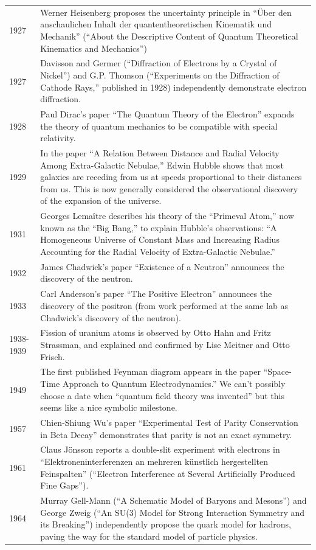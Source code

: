 \documentclass[../../main.tex]{subfiles}
\begin{document}
\begin{center}
\begin{longtable}{p{}  p{}}
1927&Werner Heisenberg proposes the uncertainty principle in “Über den anschaulichen Inhalt der quantentheoretischen Kinematik und Mechanik” (“About the Descriptive Content of Quantum Theoretical Kinematics and Mechanics”)\\
1927&Davisson and Germer (“Diffraction of Electrons by a Crystal of Nickel”) and G.P. Thomson (“Experiments on the Diffraction of Cathode Rays,” published in 1928) independently demonstrate electron diffraction.\\
1928&Paul Dirac's paper “The Quantum Theory of the Electron” expands the theory of quantum mechanics to be compatible with special relativity.\\
1929&In the paper “A Relation Between Distance and Radial Velocity Among Extra-Galactic Nebulae,” Edwin Hubble shows that most galaxies are receding from us at speeds proportional to their distances from us. This is now generally considered the observational discovery of the expansion of the universe.\\
1931&Georges Lemaître describes his theory of the “Primeval Atom,” now known as the “Big Bang,” to explain Hubble's observations: “A Homogeneous Universe of Constant Mass and Increasing Radius Accounting for the Radial Velocity of Extra-Galactic Nebulae.”\\
1932&James Chadwick's paper “Existence of a Neutron” announces the discovery of the neutron.\\
1933&Carl Anderson's paper “The Positive Electron” announces the discovery of the positron (from work performed at the same lab as Chadwick's discovery of the neutron).\\
1938-1939&Fission of uranium atoms is observed by Otto Hahn and Fritz Strassman, and explained and confirmed by Lise Meitner and Otto Frisch. \\
1949&The first published Feynman diagram appears in the paper “Space-Time Approach to Quantum Electrodynamics.” We can't possibly choose a date when “quantum field theory was invented” but this seems like a nice symbolic milestone.\\
1957&Chien-Shiung Wu's paper “Experimental Test of Parity Conservation in Beta Decay” demonstrates that parity is not an exact symmetry.\\
1961&Claus Jönsson reports a double-slit experiment with electrons in “Elektroneninterferenzen an mehreren künstlich hergestellten Feinspalten” (“Electron Interference at Several Artificially Produced Fine Gaps”).\\
1964&Murray Gell-Mann (“A Schematic Model of Baryons and Mesons”) and George Zweig (“An SU(3) Model for Strong Interaction Symmetry and its Breaking”) independently propose the quark model for hadrons, paving the way for the standard model of particle physics.\\

\end{longtable}
\end{center}
\end{document}

